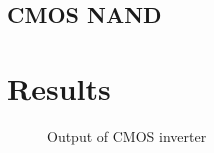 
\subsection{CMOS NAND}
\label{sec:nand}


\section{Results}
\label{sec:results}

\begin{figure}[hbtp]
  \centering
  
  \caption{\label{fig:data1} Output of CMOS inverter}
\end{figure}

